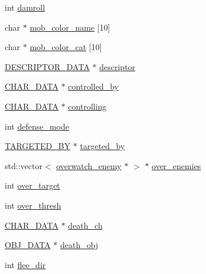 \begin{DoxyCompactItemize}
int \hyperlink{structchar__data_ad4939faa3b707ec6793b2b684a49f6f1}{damroll}
\item 
char $\ast$ \hyperlink{structchar__data_a6c09a9e248752abc7640ab2cb3cb20bd}{mob\-\_\-color\-\_\-name} \mbox{[}10\mbox{]}
\item 
char $\ast$ \hyperlink{structchar__data_aae26fdb8e0179ca6ae3e1a4c2c860cc1}{mob\-\_\-color\-\_\-cat} \mbox{[}10\mbox{]}
\item 
\hyperlink{net__link_8h_adaf40e7c4f580ba35192c957078f5771}{D\-E\-S\-C\-R\-I\-P\-T\-O\-R\-\_\-\-D\-A\-T\-A} $\ast$ \hyperlink{structchar__data_a74cebe7bd56221c380ba5acdf7388715}{descriptor}
\item 
\hyperlink{structs_8h_af33ed1e66e8541a08bed257124f50f31}{C\-H\-A\-R\-\_\-\-D\-A\-T\-A} $\ast$ \hyperlink{structchar__data_aa22dc74042039b4ddd7632f420c06ef0}{controlled\-\_\-by}
\item 
\hyperlink{structs_8h_af33ed1e66e8541a08bed257124f50f31}{C\-H\-A\-R\-\_\-\-D\-A\-T\-A} $\ast$ \hyperlink{structchar__data_a432e41923330670a5b6445cdbec6c371}{controlling}
\item 
int \hyperlink{structchar__data_a84e856daa1f5da97f5497da171888b3f}{defense\-\_\-mode}
\item 
\hyperlink{structs_8h_aeb9ebe2d6c6fb51e9a2808790ab7c0b7}{T\-A\-R\-G\-E\-T\-E\-D\-\_\-\-B\-Y} $\ast$ \hyperlink{structchar__data_a2cf40f00def92b785daadfaca6def6dd}{targeted\-\_\-by}
\item 
std\-::vector$<$ \hyperlink{structoverwatch__enemy}{overwatch\-\_\-enemy} $\ast$ $>$ $\ast$ \hyperlink{structchar__data_aee8c8a5f8fe5f91141c9d5bab432e9c5}{over\-\_\-enemies}
\item 
int \hyperlink{structchar__data_acac06ecc6bd5a27ba18bf00de42d491c}{over\-\_\-target}
\item 
int \hyperlink{structchar__data_a8d07f96507e48e787ff1366c02559965}{over\-\_\-thresh}
\item 
\hyperlink{structs_8h_af33ed1e66e8541a08bed257124f50f31}{C\-H\-A\-R\-\_\-\-D\-A\-T\-A} $\ast$ \hyperlink{structchar__data_aa0de5074106c9bacde36bbad35e59412}{death\-\_\-ch}
\item 
\hyperlink{structs_8h_aaa59141dfc8c6ecdb6bfcf1537dd52d1}{O\-B\-J\-\_\-\-D\-A\-T\-A} $\ast$ \hyperlink{structchar__data_a2fee677813a04d34449256153dc6a236}{death\-\_\-obj}
\item 
int \hyperlink{structchar__data_ac61f566381233b16f79ce60741be7c87}{flee\-\_\-dir}
\end{DoxyCompactItemize}


